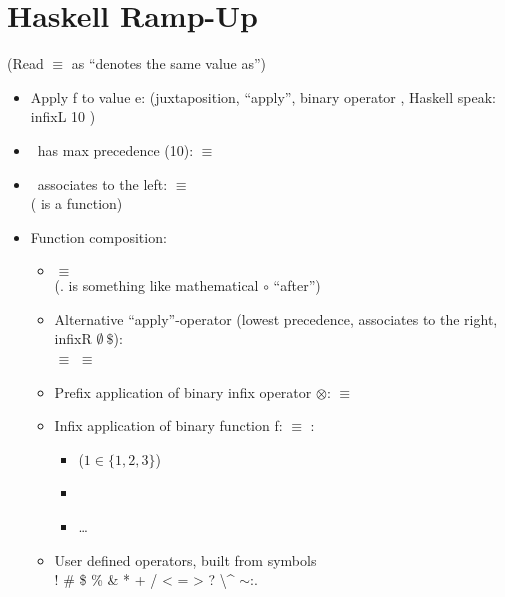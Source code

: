 

\chapter{Haskell Ramp-Up} %
\label{cha:haskell_ramp_up}

(Read $\equiv$ as ``denotes the same value as'')

\begin{itemize}
    \item Apply f to value e:  (juxtaposition, ``apply'', binary operator \textvisiblespace, Haskell speak: infixL 10 \textvisiblespace)
    \item \textvisiblespace\ has max precedence (10):  $\equiv$ 
    \item \textvisiblespace\ associates to the left:  $\equiv$  \\ ( is a function) \item Function composition: \begin{itemize}
        \item {} $\equiv$  \\ (. is something like mathematical $\circ$ ``after'')
        \item Alternative ``apply''-operator \codeline{\$} (lowest precedence, associates to the right, infixR $\emptyset\ \$$):\\
             $\equiv$  $\equiv$ 
        \item Prefix application of binary infix operator $\otimes$:  $\equiv$  
        \item Infix application of binary function f:  $\equiv$ :
        \begin{itemize}
            \item {}   ($1 \in \{1,2,3\}$)
            \item {}
            \item \dots
        \end{itemize}
        \item User defined operators, built from symbols \\ ! \# \$ \% \& * + / < = > ? \@ \textbackslash \string^ \textbar $\sim$:.
    \end{itemize}
\end{itemize} 



